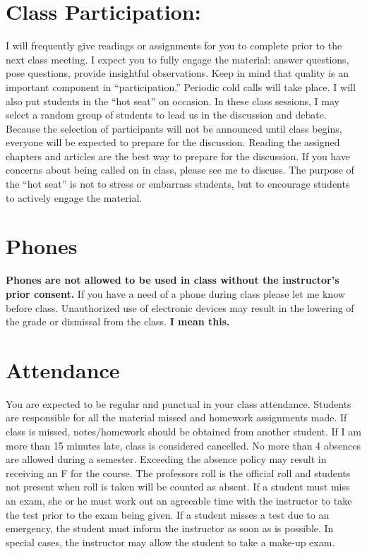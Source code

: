 \documentclass[
]{book}
\theoremstyle{definition}
\theoremstyle{definition}
\theoremstyle{definition}
\theoremstyle{definition}
\theoremstyle{remark}
\begin{document}
\hypertarget{class-participation}{%
\section{Class Participation:}\label{class-participation}}

I will frequently give readings or assignments for you to complete prior to the next class meeting. I expect you to fully engage the material: answer questions, pose questions, provide insightful observations. Keep in mind that quality is an important component in ``participation.'' Periodic cold calls will take place. I will also put students in the ``hot seat'' on occasion. In these class sessions, I may select a random group of students to lead us in the discussion and debate. Because the selection of participants will not be announced until class begins, everyone will be expected to prepare for the discussion. Reading the assigned chapters and articles are the best way to prepare for the discussion. If you have concerns about being called on in class, please see me to discuss. The purpose of the ``hot seat'' is not to stress or embarrass students, but to encourage students to actively engage the material.

\hypertarget{phones}{%
\section{Phones}\label{phones}}

\textbf{Phones are not allowed to be used in class without the instructor's prior consent.} If you have a need of a phone during class please let me know before class. Unauthorized use of electronic devices may result in the lowering of the grade or dismissal from the class. \textbf{I mean this.}

\hypertarget{attendance}{%
\section{Attendance}\label{attendance}}

You are expected to be regular and punctual in your class attendance. Students are responsible for all the material missed and homework assignments made. If class is missed, notes/homework should be obtained from another student. If I am more than 15 minutes late, class is considered cancelled. No more than 4 absences are allowed during a semester. Exceeding the absence policy may result in receiving an F for the course. The professors roll is the official roll and students not present when roll is taken will be counted as absent. If a student must miss an exam, she or he must work out an agreeable time with the instructor to take the test prior to the exam being given. If a student misses a test due to an emergency, the student must inform the instructor as soon as is possible. In special cases, the instructor may allow the student to take a make-up exam.
\end{document}
